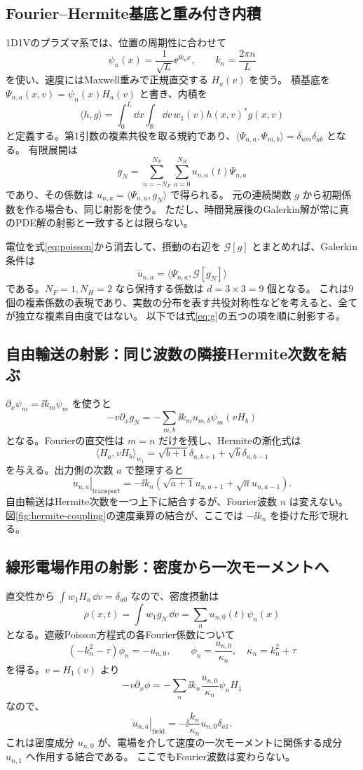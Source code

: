\subsection{Fourier--Hermite基底と重み付き内積}
1D1Vのプラズマ系では、位置の周期性に合わせて
\[
\psi_n(x)=\frac1{\sqrt L}\ee^{\ii k_nx},\qquad k_n=\frac{2\pi n}{L}
\]
を使い、速度にはMaxwell重みで正規直交する $H_a(v)$ を使う。
積基底を $\Psi_{n,a}(x,v)=\psi_n(x)H_a(v)$ と書き、内積を
\[
\boxed{\langle h,g\rangle=
\int_0^L\dd x\int_{\mathbb R}\dd v\,w_1(v)h(x,v)^*g(x,v)}
\]
と定義する。第1引数の複素共役を取る規約であり、$\langle\Psi_{n,a},\Psi_{m,b}\rangle=\delta_{nm}\delta_{ab}$ となる。
有限展開は
\[
g_N=\sum_{n=-N_F}^{N_F}\sum_{a=0}^{N_H}u_{n,a}(t)\Psi_{n,a}
\]
であり、その係数は $u_{n,a}=\langle\Psi_{n,a},g_N\rangle$ で得られる。
元の連続関数 $g$ から初期係数を作る場合も、同じ射影を使う。
ただし、時間発展後のGalerkin解が常に真のPDE解の射影と一致するとは限らない。

電位を式\eqref{eq:poisson}から消去して、摂動の右辺を $\mathcal G[g]$ とまとめれば、Galerkin条件は
\[
\boxed{\dot u_{n,a}=\langle\Psi_{n,a},\mathcal G[g_N]\rangle}
\]
である。$N_F=1,N_H=2$ なら保持する係数は $d=3\times3=9$ 個となる。
これは9個の複素係数の表現であり、実数の分布を表す共役対称性などを考えると、全てが独立な複素自由度ではない。
以下では式\eqref{eq:g}の五つの項を順に射影する。

\subsection{自由輸送の射影：同じ波数の隣接Hermite次数を結ぶ}
$\partial_x\psi_m=\ii k_m\psi_m$ を使うと
\[
-v\partial_xg_N=-\sum_{m,b}\ii k_m u_{m,b}\psi_m(vH_b)
\]
となる。Fourierの直交性は $m=n$ だけを残し、Hermiteの漸化式は
\[
\langle H_a,vH_b\rangle_{w_1}
=\sqrt{b+1}\delta_{a,b+1}+\sqrt b\delta_{a,b-1}
\]
を与える。出力側の次数 $a$ で整理すると
\[
\boxed{\left.\dot u_{n,a}\right|_{\mathrm{transport}}
=-\ii k_n\left(\sqrt{a+1}u_{n,a+1}+\sqrt a u_{n,a-1}\right)}.
\]
自由輸送はHermite次数を一つ上下に結合するが、Fourier波数 $n$ は変えない。
図\ref{fig:hermite-coupling}の速度乗算の結合が、ここでは $-\ii k_n$ を掛けた形で現れる。

\subsection{線形電場作用の射影：密度から一次モーメントへ}
直交性から $\int w_1H_a\,\dd v=\delta_{a0}$ なので、密度摂動は
\[
\rho(x,t)=\int w_1g_N\,\dd v=\sum_nu_{n,0}(t)\psi_n(x)
\]
となる。遮蔽Poisson方程式の各Fourier係数について
\[
(-k_n^2-\tau)\phi_n=-u_{n,0},\qquad
\phi_n=\frac{u_{n,0}}{\kappa_n},\quad\kappa_n=k_n^2+\tau
\]
を得る。$v=H_1(v)$ より
\[
-v\partial_x\phi=-\sum_n\ii k_n\frac{u_{n,0}}{\kappa_n}\psi_nH_1
\]
なので、
\[
\boxed{\left.\dot u_{n,a}\right|_{\mathrm{field}}
=-\ii\frac{k_n}{\kappa_n}u_{n,0}\delta_{a1}}.
\]
これは密度成分 $u_{n,0}$ が、電場を介して速度の一次モーメントに関係する成分 $u_{n,1}$ へ作用する結合である。
ここでもFourier波数は変わらない。

